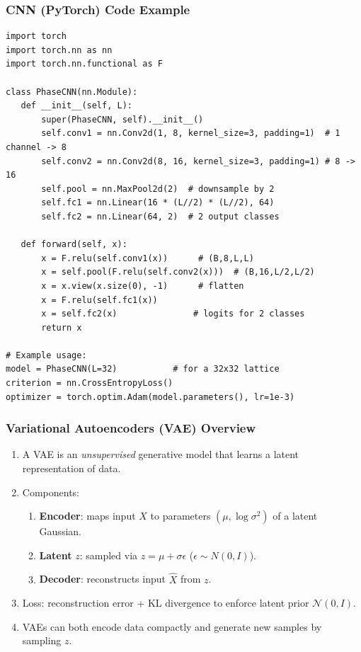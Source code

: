 \documentclass{beamer}
\begin{document}
\begin{frame}
\frametitle{CNN (PyTorch) Code Example}

\begin{verbatim}
import torch
import torch.nn as nn
import torch.nn.functional as F

class PhaseCNN(nn.Module):
   def __init__(self, L):
       super(PhaseCNN, self).__init__()
       self.conv1 = nn.Conv2d(1, 8, kernel_size=3, padding=1)  # 1 channel -> 8
       self.conv2 = nn.Conv2d(8, 16, kernel_size=3, padding=1) # 8 -> 16
       self.pool = nn.MaxPool2d(2)  # downsample by 2
       self.fc1 = nn.Linear(16 * (L//2) * (L//2), 64)
       self.fc2 = nn.Linear(64, 2)  # 2 output classes

   def forward(self, x):
       x = F.relu(self.conv1(x))      # (B,8,L,L)
       x = self.pool(F.relu(self.conv2(x)))  # (B,16,L/2,L/2)
       x = x.view(x.size(0), -1)      # flatten
       x = F.relu(self.fc1(x))
       x = self.fc2(x)               # logits for 2 classes
       return x

# Example usage:
model = PhaseCNN(L=32)           # for a 32x32 lattice
criterion = nn.CrossEntropyLoss()
optimizer = torch.optim.Adam(model.parameters(), lr=1e-3)

\end{verbatim}
\end{frame}

\begin{frame}
\frametitle{Variational Autoencoders (VAE) Overview}

\begin{enumerate}
\item A VAE is an \emph{unsupervised} generative model that learns a latent representation of data.

\item Components:
\begin{enumerate}

  \item \textbf{Encoder}: maps input $X$ to parameters $(\mu, \log\sigma^2)$ of a latent Gaussian.

  \item \textbf{Latent} $z$: sampled via $z = \mu + \sigma \epsilon$ ($\epsilon\sim N(0,I)$).

  \item \textbf{Decoder}: reconstructs input $\hat{X}$ from $z$.

\end{enumerate}

\noindent
\item Loss: reconstruction error + KL divergence to enforce latent prior $\mathcal{N}(0,I)$.

\item VAEs can both encode data compactly and generate new samples by sampling $z$.
\end{enumerate}

\noindent
\end{frame}
\end{document}
